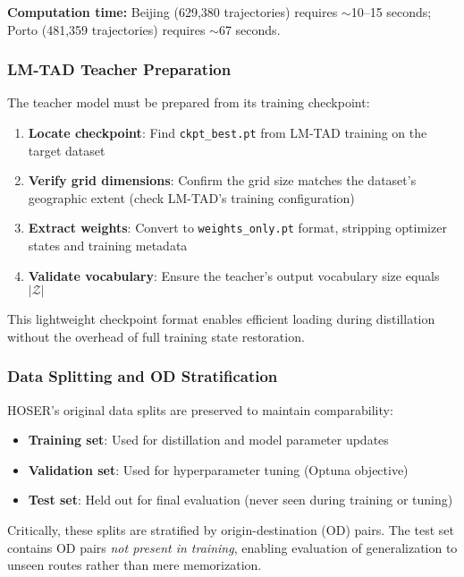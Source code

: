 \textbf{Computation time:} Beijing (629,380 trajectories) requires $\sim$10--15 seconds; Porto (481,359 trajectories) requires $\sim$67 seconds.

\subsubsection{LM-TAD Teacher Preparation}

The teacher model must be prepared from its training checkpoint:

\begin{enumerate}[noitemsep,topsep=0pt]
\item \textbf{Locate checkpoint}: Find \texttt{ckpt\_best.pt} from LM-TAD training on the target dataset
\item \textbf{Verify grid dimensions}: Confirm the grid size matches the dataset's geographic extent (check LM-TAD's training configuration)
\item \textbf{Extract weights}: Convert to \texttt{weights\_only.pt} format, stripping optimizer states and training metadata
\item \textbf{Validate vocabulary}: Ensure the teacher's output vocabulary size equals $|\mathcal{Z}|$
\end{enumerate}

This lightweight checkpoint format enables efficient loading during distillation without the overhead of full training state restoration.

\subsubsection{Data Splitting and OD Stratification}

HOSER's original data splits are preserved to maintain comparability:

\begin{itemize}[noitemsep,topsep=0pt]
\item \textbf{Training set}: Used for distillation and model parameter updates
\item \textbf{Validation set}: Used for hyperparameter tuning (Optuna objective)
\item \textbf{Test set}: Held out for final evaluation (never seen during training or tuning)
\end{itemize}

Critically, these splits are stratified by origin-destination (OD) pairs. The test set contains OD pairs \emph{not present in training}, enabling evaluation of generalization to unseen routes rather than mere memorization.

